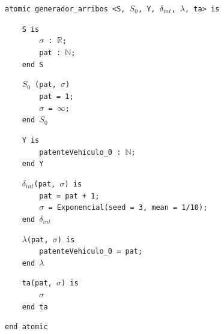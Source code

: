\documentclass[12pt]{article}
\begin{document}
\begin{tcolorbox}[
    colback=black!5!white,
    colframe=black!80!white,
    boxrule=0.8pt,
    arc=2pt,
    left=5pt,
    right=5pt,
    top=5pt,
    bottom=5pt,
    fontupper=\ttfamily,
    breakable
]
\begin{flushleft}
\texttt{atomic generador\_arribos <S, $S_0$, Y, }$\delta_{int}$\texttt{, }$\lambda$\texttt{, ta>}\texttt{ is}
\end{flushleft}

\begin{flushleft}
\texttt{~~~~S is} \\
\texttt{~~~~~~~~}$\sigma$\texttt{ : }\(\mathbb{R}\)\texttt{;} \\
\texttt{~~~~~~~~pat : }\(\mathbb{N}\)\texttt{;} \\
\texttt{~~~~end S}
\end{flushleft}

\begin{flushleft}
\texttt{~~~~$S_0$ (pat, }$\sigma$\texttt{)} \\
\texttt{~~~~~~~~pat = 1;} \\
\texttt{~~~~~~~~}$\sigma$\texttt{ = }$\infty$\texttt{;} \\
\texttt{~~~~end $S_0$}
\end{flushleft}

\begin{flushleft}
\texttt{~~~~Y is} \\
\texttt{~~~~~~~~patenteVehiculo\_0 : }\(\mathbb{N}\)\texttt{;} \\
\texttt{~~~~end Y}
\end{flushleft}

\begin{flushleft}
\texttt{~~~~}$\delta_{int}$\texttt{(pat, }$\sigma$\texttt{) is} \\
\texttt{~~~~~~~~pat = pat + 1;} \\
\texttt{~~~~~~~~}$\sigma$\texttt{ = Exponencial(seed = 3, mean = 1/10);} \\
\texttt{~~~~end }$\delta_{int}$
\end{flushleft}

\begin{flushleft}
\texttt{~~~~}$\lambda$\texttt{(pat, }$\sigma$\texttt{) is} \\
\texttt{~~~~~~~~patenteVehiculo\_0 = pat;} \\
\texttt{~~~~end }$\lambda$
\end{flushleft}

\begin{flushleft}
\texttt{~~~~ta(pat, }$\sigma$\texttt{) is} \\
\texttt{~~~~~~~~}$\sigma$ \\
\texttt{~~~~end ta}
\end{flushleft}

\begin{flushleft}
\texttt{end atomic}
\end{flushleft}
\end{tcolorbox}
\end{document}
